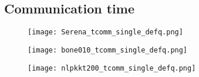 



\subsection{Communication time}

\begin{figure}[H]
    \begin{center}
        \texttt{[image: Serena\_tcomm\_single\_defq.png]}
    \end{center}
    \caption{}
    \label{fig:Serena_tcomm_single_defq.png}
\end{figure}


\begin{figure}[H]
    \begin{center}
        \texttt{[image: bone010\_tcomm\_single\_defq.png]}
    \end{center}
    \caption{}
    \label{fig:bone010_tcomm_single_defq.png}
\end{figure}

\begin{figure}[H]
    \begin{center}
        \texttt{[image: nlpkkt200\_tcomm\_single\_defq.png]}
    \end{center}
    \caption{}
    \label{fig:nlpkkt200_tcomm_single_defq.png}
\end{figure}


